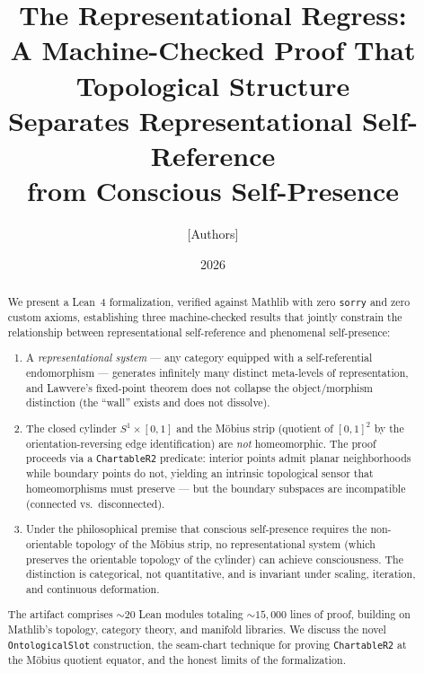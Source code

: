 \documentclass[11pt]{article}
\title{The Representational Regress:\\
  A Machine-Checked Proof That Topological Structure\\
  Separates Representational Self-Reference\\
  from Conscious Self-Presence}
\author{[Authors]}
\date{2026}
\begin{document}
\maketitle

\begin{abstract}
We present a Lean~4 formalization, verified against Mathlib with zero
\texttt{sorry} and zero custom axioms, establishing three machine-checked results
that jointly constrain the relationship between representational self-reference
and phenomenal self-presence:

\begin{enumerate}[label=(\roman*)]
\item A \emph{representational system} --- any category equipped with a
  self-referential endomorphism --- generates infinitely many distinct
  meta-levels of representation, and Lawvere's fixed-point theorem does not
  collapse the object/morphism distinction (the ``wall'' exists and does not
  dissolve).
\item The closed cylinder $S^1 \times [0,1]$ and the M\"obius strip
  (quotient of $[0,1]^2$ by the orientation-reversing edge identification)
  are \emph{not} homeomorphic. The proof proceeds via a \texttt{ChartableR2}
  predicate: interior points admit planar neighborhoods while boundary points
  do not, yielding an intrinsic topological sensor that homeomorphisms must
  preserve --- but the boundary subspaces are incompatible (connected vs.\
  disconnected).
\item Under the philosophical premise that conscious self-presence requires
  the non-orientable topology of the M\"obius strip, no representational system
  (which preserves the orientable topology of the cylinder) can achieve
  consciousness. The distinction is categorical, not quantitative, and is
  invariant under scaling, iteration, and continuous deformation.
\end{enumerate}

The artifact comprises ${\sim}20$ Lean modules totaling ${\sim}15{,}000$
lines of proof, building on Mathlib's topology, category theory, and manifold
libraries. We discuss the novel \texttt{OntologicalSlot} construction, the
seam-chart technique for proving \texttt{ChartableR2} at the M\"obius quotient
equator, and the honest limits of the formalization.
\end{abstract}
\end{document}
